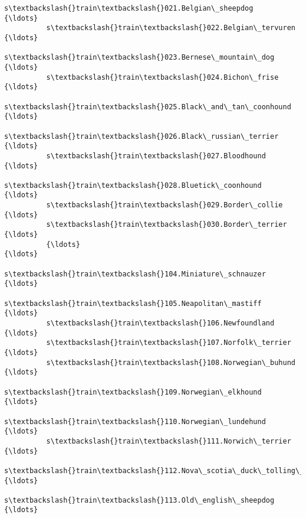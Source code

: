 \documentclass[11pt]{article}
\begin{document}
\begin{Verbatim}[commandchars=\\\{\}]
          s\textbackslash{}train\textbackslash{}021.Belgian\_sheepdog                                {\ldots}                 
          s\textbackslash{}train\textbackslash{}022.Belgian\_tervuren                                {\ldots}                 
          s\textbackslash{}train\textbackslash{}023.Bernese\_mountain\_dog                            {\ldots}                 
          s\textbackslash{}train\textbackslash{}024.Bichon\_frise                                    {\ldots}                 
          s\textbackslash{}train\textbackslash{}025.Black\_and\_tan\_coonhound                         {\ldots}                 
          s\textbackslash{}train\textbackslash{}026.Black\_russian\_terrier                           {\ldots}                 
          s\textbackslash{}train\textbackslash{}027.Bloodhound                                      {\ldots}                 
          s\textbackslash{}train\textbackslash{}028.Bluetick\_coonhound                              {\ldots}                 
          s\textbackslash{}train\textbackslash{}029.Border\_collie                                   {\ldots}                 
          s\textbackslash{}train\textbackslash{}030.Border\_terrier                                  {\ldots}                 
          {\ldots}                                                         {\ldots}                 
          s\textbackslash{}train\textbackslash{}104.Miniature\_schnauzer                             {\ldots}                 
          s\textbackslash{}train\textbackslash{}105.Neapolitan\_mastiff                              {\ldots}                 
          s\textbackslash{}train\textbackslash{}106.Newfoundland                                    {\ldots}                 
          s\textbackslash{}train\textbackslash{}107.Norfolk\_terrier                                 {\ldots}                 
          s\textbackslash{}train\textbackslash{}108.Norwegian\_buhund                                {\ldots}                 
          s\textbackslash{}train\textbackslash{}109.Norwegian\_elkhound                              {\ldots}                 
          s\textbackslash{}train\textbackslash{}110.Norwegian\_lundehund                             {\ldots}                 
          s\textbackslash{}train\textbackslash{}111.Norwich\_terrier                                 {\ldots}                 
          s\textbackslash{}train\textbackslash{}112.Nova\_scotia\_duck\_tolling\_retriever              {\ldots}                 
          s\textbackslash{}train\textbackslash{}113.Old\_english\_sheepdog                            {\ldots}                 

\end{Verbatim}
\end{document}
